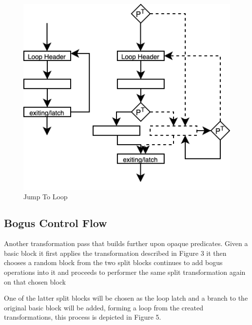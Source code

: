 \begin{figure}
  \includegraphics[width=1\textwidth]{./images/jump-to-loop.png}
  \caption{Jump To Loop}
\end{figure}

\subsection{Bogus Control Flow}

Another transformation pass that builds further upon opaque predicates. Given a basic block it first
applies the transformation described in Figure 3 it then chooses a random block from the two split blocks
continues to add bogus operations into it and proceeds to performer the same split transformation again on that chosen block

One of the latter split blocks will be chosen as the loop latch and a branch to the original basic block will be added,
forming a loop from the created transformations, this process is depicted in Figure 5.

